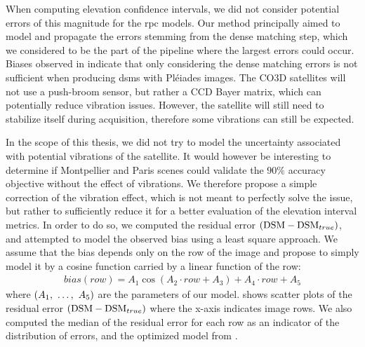 When computing elevation confidence intervals, we did not consider potential errors of this magnitude for the \acrshort{rpc} models. Our method principally aimed to model and propagate the errors stemming from the dense matching step, which we considered to be the part of the pipeline where the largest errors could occur. Biases observed in  indicate that only considering the dense matching errors is not sufficient when producing \acrshort{dsm}s with Pléiades images. The CO3D satellites will not use a push-broom sensor, but rather a CCD Bayer matrix, which can potentially reduce vibration issues. However, the satellite will still need to stabilize itself during acquisition, therefore some vibrations can still be expected. 

In the scope of this thesis, we did not try to model the uncertainty associated with potential vibrations of the satellite. It would however be interesting to determine if Montpellier and Paris scenes could validate the $90\%$ accuracy objective without the effect of vibrations. We therefore propose a simple correction of the vibration effect, which is not meant to perfectly solve the issue, but rather to sufficiently reduce it for a better evaluation of the elevation interval metrics. In order to do so, we computed the residual error $(\mathrm{DSM}-\mathrm{DSM}_{true})$, and attempted to model the observed bias using a least square approach. We assume that the bias depends only on the row of the image and propose to simply model it by a cosine function carried by a linear function of the row:
\begin{align}\label{eq:bias_model}
    bias(row)=A_1\cos(A_2\cdot row+A_3) + A_4\cdot row+A_5
\end{align}
where $(A_1, ~\ldots, ~ A_5)$ are the parameters of our model.  shows scatter plots of the residual error $(\mathrm{DSM}-\mathrm{DSM}_{true})$ where the x-axis indicates image rows. We also computed the median of the residual error for each row as an indicator of the distribution of errors, and the optimized model from .

